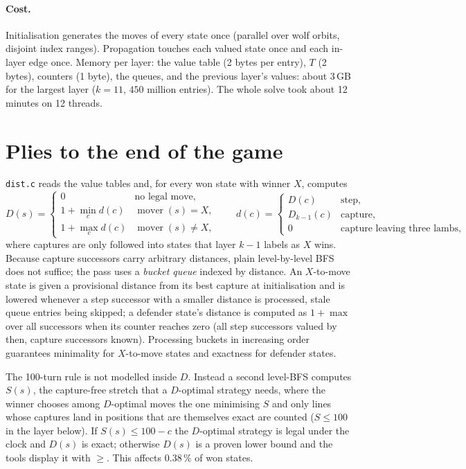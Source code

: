 \documentclass[11pt,a4paper]{article}
\DeclareMathOperator{\mover}{mover}
\begin{document}
\paragraph{Cost.} Initialisation generates the moves of every state once
(parallel over wolf orbits, disjoint index ranges). Propagation touches each
valued state once and each in-layer edge once. Memory per layer: the value table
(2 bytes per entry), $T$ (2 bytes), counters (1 byte), the queues, and the
previous layer's values: about 3\,GB for the largest layer ($k=11$,
$450$ million entries). The whole solve took about 12 minutes on 12 threads.

\section{Plies to the end of the game}

\texttt{dist.c} reads the value tables and, for every won state with winner $X$,
computes
\[
D(s)=\begin{cases}0 & \text{no legal move},\\ 1+\min_c d(c) & \mover(s)=X,\\ 1+\max_c d(c) & \mover(s)\ne X,\end{cases}
\qquad
d(c)=\begin{cases} D(c) & \text{step},\\ D_{k-1}(c) & \text{capture},\\ 0 & \text{capture leaving three lambs},\end{cases}
\]
where captures are only followed into states that layer $k-1$ labels as $X$ wins.
Because capture successors carry arbitrary distances, plain level-by-level BFS
does not suffice; the pass uses a \emph{bucket queue} indexed by distance. An
$X$-to-move state is given a provisional distance from its best capture at
initialisation and is lowered whenever a step successor with a smaller distance
is processed, stale queue entries being skipped; a defender state's distance is
computed as $1+\max$ over all successors when its counter reaches zero (all
step successors valued by then, capture successors known). Processing buckets in
increasing order guarantees minimality for $X$-to-move states and exactness for
defender states.

The 100-turn rule is not modelled inside $D$. Instead a second level-BFS
computes $S(s)$, the capture-free stretch that a $D$-optimal strategy needs,
where the winner chooses among $D$-optimal moves the one minimising $S$ and only
lines whose captures land in positions that are themselves exact are counted
($S\le100$ in the layer below). If $S(s)\le100-c$ the $D$-optimal strategy is
legal under the clock and $D(s)$ is exact; otherwise $D(s)$ is a proven lower
bound and the tools display it with $\ge$. This affects $0.38\,\%$ of won states.
\end{document}
